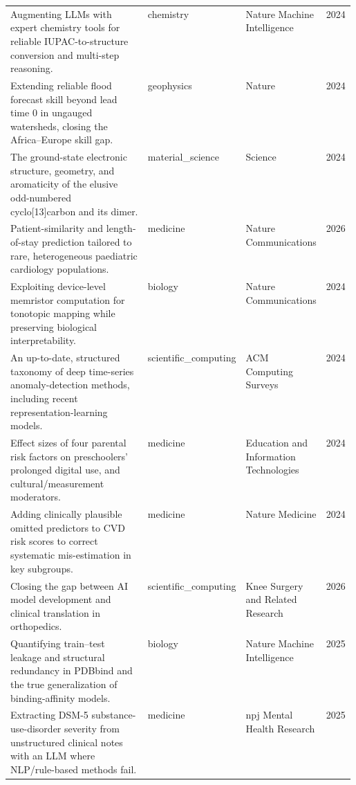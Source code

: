 \begin{landscape}
\begin{longtable}{@{}p{0.58\linewidth} l l c@{}}
\addlinespace
Augmenting LLMs with expert chemistry tools for reliable IUPAC-to-structure conversion and multi-step reasoning. & chemistry & Nature Machine Intelligence & 2024 \\
\addlinespace
Extending reliable flood forecast skill beyond lead time 0 in ungauged watersheds, closing the Africa--Europe skill gap. & geophysics & Nature & 2024 \\
\addlinespace
The ground-state electronic structure, geometry, and aromaticity of the elusive odd-numbered cyclo[13]carbon and its dimer. & material\_science & Science & 2024 \\
\addlinespace
Patient-similarity and length-of-stay prediction tailored to rare, heterogeneous paediatric cardiology populations. & medicine & Nature Communications & 2026 \\
\addlinespace
Exploiting device-level memristor computation for tonotopic mapping while preserving biological interpretability. & biology & Nature Communications & 2024 \\
\addlinespace
An up-to-date, structured taxonomy of deep time-series anomaly-detection methods, including recent representation-learning models. & scientific\_computing & ACM Computing Surveys & 2024 \\
\addlinespace
Effect sizes of four parental risk factors on preschoolers' prolonged digital use, and cultural/measurement moderators. & medicine & Education and Information Technologies & 2024 \\
\addlinespace
Adding clinically plausible omitted predictors to CVD risk scores to correct systematic mis-estimation in key subgroups. & medicine & Nature Medicine & 2024 \\
\addlinespace
Closing the gap between AI model development and clinical translation in orthopedics. & scientific\_computing & Knee Surgery and Related Research & 2026 \\
\addlinespace
Quantifying train--test leakage and structural redundancy in PDBbind and the true generalization of binding-affinity models. & biology & Nature Machine Intelligence & 2025 \\
\addlinespace
Extracting DSM-5 substance-use-disorder severity from unstructured clinical notes with an LLM where NLP/rule-based methods fail. & medicine & npj Mental Health Research & 2025 \\

\end{longtable}
\end{landscape}

